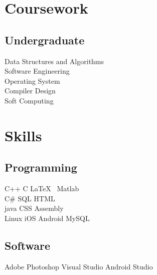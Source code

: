 \documentclass[a4paper]{deedy-resume} %
\begin{document}
\begin{minipage}[t]{0.33\textwidth}
\sectionspace %


\section{Coursework}

\subsection{Undergraduate}

Data Structures and Algorithms \\
Software Engineering \\
Operating System \\
Compiler Design \\
Soft Computing\\

\sectionspace %



\section{Skills}

\subsection{Programming}

C++ \textbullet{} C \textbullet{} \LaTeX\  \textbullet{} Matlab \\
C\# \textbullet{} SQL \textbullet{} HTML \\ 
java \textbullet{}  CSS \textbullet{} Assembly \\
Linux \textbullet{} iOS \textbullet{} Android \textbullet{} MySQL
\sectionspace
\subsection{Software}
Adobe Photoshop \textbullet{} Visual Studio \textbullet{} Android Studio

\sectionspace %


\end{minipage} %
\end{document}
